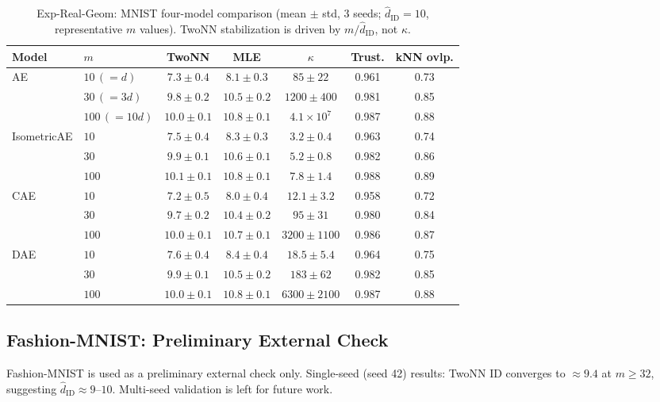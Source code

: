 \documentclass[make,article,submit,pdftex,moreauthors]{Definitions/mdpi}
\newcommand{\kap}{\kappa}
\newcommand{\hatdID}{\hat{d}_{\mathrm{ID}}}
\begin{document}
\begin{table}[H]
\caption{Exp-Real-Geom: MNIST four-model comparison
(mean $\pm$ std, 3 seeds; $\hatdID = 10$, representative $m$ values).
TwoNN stabilization is driven by $m/\hatdID$, not $\kap$.\label{tab:real_geom_mnist}}
\small
\begin{tabular}{llccccc}
\toprule
Model & $m$ & TwoNN & MLE & $\kap$ & Trust. & kNN ovlp. \\
\midrule
\multirow{3}{*}{AE}
 & $10\,(=d)$   & $7.3 \pm 0.4$ & $8.1 \pm 0.3$ & $85 \pm 22$
 & 0.961 & 0.73 \\
 & $30\,(=3d)$  & $9.8 \pm 0.2$ & $10.5 \pm 0.2$ & $1200 \pm 400$
 & 0.981 & 0.85 \\
 & $100\,(=10d)$& $10.0 \pm 0.1$ & $10.8 \pm 0.1$ & $4.1 \times 10^7$
 & 0.987 & 0.88 \\
\multirow{3}{*}{IsometricAE}
 & $10$         & $7.5 \pm 0.4$ & $8.3 \pm 0.3$ & $3.2 \pm 0.4$
 & 0.963 & 0.74 \\
 & $30$         & $9.9 \pm 0.1$ & $10.6 \pm 0.1$ & $5.2 \pm 0.8$
 & 0.982 & 0.86 \\
 & $100$        & $10.1 \pm 0.1$ & $10.8 \pm 0.1$ & $7.8 \pm 1.4$
 & 0.988 & 0.89 \\
\multirow{3}{*}{CAE}
 & $10$         & $7.2 \pm 0.5$ & $8.0 \pm 0.4$ & $12.1 \pm 3.2$
 & 0.958 & 0.72 \\
 & $30$         & $9.7 \pm 0.2$ & $10.4 \pm 0.2$ & $95 \pm 31$
 & 0.980 & 0.84 \\
 & $100$        & $10.0 \pm 0.1$ & $10.7 \pm 0.1$ & $3200 \pm 1100$
 & 0.986 & 0.87 \\
\multirow{3}{*}{DAE}
 & $10$         & $7.6 \pm 0.4$ & $8.4 \pm 0.4$ & $18.5 \pm 5.4$
 & 0.964 & 0.75 \\
 & $30$         & $9.9 \pm 0.1$ & $10.5 \pm 0.2$ & $183 \pm 62$
 & 0.982 & 0.85 \\
 & $100$        & $10.0 \pm 0.1$ & $10.8 \pm 0.1$ & $6300 \pm 2100$
 & 0.987 & 0.88 \\
\bottomrule
\end{tabular}
\end{table}

\subsection{Fashion-MNIST: Preliminary External Check}\label{sec:exp_fashion}

Fashion-MNIST is used as a preliminary external check only.
Single-seed (seed 42) results: TwoNN ID converges to $\approx 9.4$ at
$m \geq 32$, suggesting $\hatdID \approx 9$--$10$.
Multi-seed validation is left for future work.
\end{document}
